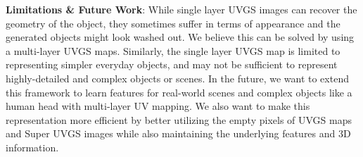 \noindent\textbf{Limitations \& Future Work}: 
While single layer UVGS images can recover the geometry of the object, they sometimes suffer in terms of appearance and the generated objects might look washed out. 
We believe this can be solved by using a multi-layer UVGS maps. 
Similarly, the single layer UVGS map is limited to representing simpler everyday objects, and may not be sufficient to represent highly-detailed and complex objects or scenes. 
In the future, we want to extend this framework to learn features for real-world scenes and complex objects like a human head with multi-layer UV mapping. 
We also want to make this representation more efficient by better utilizing the empty pixels of UVGS maps and Super UVGS images while also maintaining the underlying features and 3D information.
\begin{table}[t]
\centering
\setlength{\tabcolsep}{0.75mm}
\renewcommand{\arraystretch}{1.2}
\vspace{-0.2cm}
\caption{We compare the FID and KID of unconditional generation using the current SOTA methods on 20K randomly generated samples from each method and ours. We also compare our method against SOTA text-conditioned generation frameworks on CLIP Score for 10K generated objects from each method. 
}
\vspace{-0.2cm}
\label{table:unconditional} 
\vspace{-0.2cm}
\end{table}


